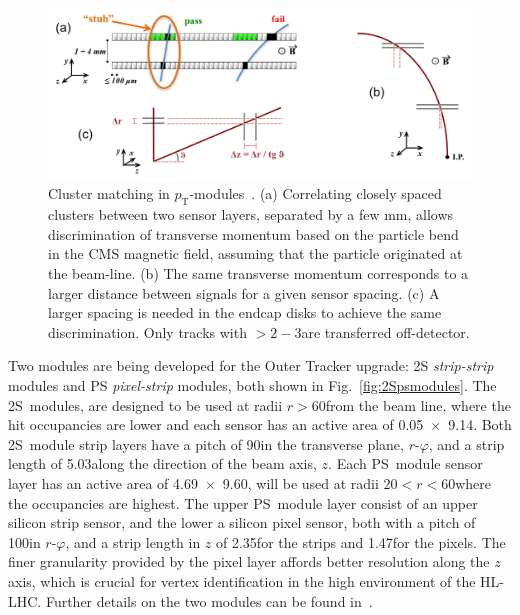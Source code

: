 \begin{figure}[!t]
\centering
\includegraphics[width=5in]{figs/tk-upgrade/pTsketches.png}
\caption{Cluster matching in $p_\mathrm{T}$-modules~\cite{P2TrackerTDR}. (a) Correlating closely spaced clusters between two sensor layers, separated by a few mm, allows discrimination of transverse momentum based on the particle bend in the CMS magnetic field, assuming that the particle originated at the beam-line. (b) The same transverse momentum corresponds to a larger distance between signals for a given sensor spacing. (c) A larger spacing is needed in the endcap disks to achieve the same discrimination. Only tracks with \pT $> 2-3$\GeVc are transferred off-detector.
}
\label{fig:stubs}
\end{figure}

Two \pT modules are being developed for the Outer Tracker upgrade: 2S \emph{strip-strip} modules and PS \emph{pixel-strip} modules, both shown in Fig.~\ref{fig:2Spsmodules}.
The 2S~modules, are designed to be used at radii $r>60$\cm from the beam line, where the hit occupancies are lower and each sensor has an active area of 0.05\cm~$\times$~9.14\cm.
Both 2S~module strip layers have a pitch of 90\mum in the transverse plane, $r$-$\varphi$, and a strip length of 5.03\cm along the direction of the beam axis, $z$.
Each PS~module sensor layer has an active area of 4.69\cm~$\times$~9.60\cm, will be used at radii $20<r<60$\cm where the occupancies are highest.
The upper PS~module layer consist of an upper silicon strip sensor, and the lower a silicon pixel sensor, both with a pitch of 100\mum in $r$-$\varphi$, and a strip length in $z$ of 2.35\cm for the strips and 1.47\mm for the pixels.
The finer granularity provided by the pixel layer affords better resolution along the $z$ axis, which is crucial for vertex identification in the high \PU environment of the HL-LHC.
Further details on the two \pT modules can be found in~\cite{CMS_Upgrade_TP,P2TrackerTDR}.
 
